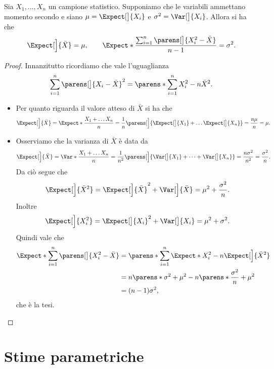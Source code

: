 \begin{proposition}
    Sia $X_1, \dots, X_n$ un campione statistico. Supponiamo che le variabili ammettano momento secondo e siano $\mu = \Expect[\big]{X_i}$ e $\sigma^2 = \Var[\big]{X_i}$. Allora si ha che \[
        \Expect[\Big]{\bar X} = \mu, \qquad \Expect*{\frac{\sum_{i = 1}^n \parens[\big]{X_i^2 - \bar X}}{n - 1}} = \sigma^2.
    \]
\end{proposition}
\begin{proof}
    Innanzitutto ricordiamo che vale l'uguaglianza \[
        \sum_{i = 1}^n \parens[\big]{X_i - \bar X}^2 = \parens*{\sum_{i = 1}^n X_i^2} - n\bar X^2.    
    \]
    \begin{itemize}
        \item Per quanto riguarda il valore atteso di $\bar X$ si ha che \[
            \Expect[\Big]{\bar X} 
            = \Expect*{\frac{X_1 + \dots X_n}{n}} 
            = \frac1n\parens[\Big]{\Expect[\big]{X_1} + \dots \Expect[\big]{X_n}}     
            = \frac{n\mu}{n} = \mu.
        \]
        \item Osserviamo che la varianza di $\bar X$ è data da \[
            \Expect[\Big]{\bar X} 
            = \Var*{\frac{X_1 + \dots X_n}{n}} 
            = \frac1{n^2}\parens[\Big]{\Var[\big]{X_1} + \dots + \Var[\big]{X_n}}     
            = \frac{n\sigma^2}{n^2} = \frac{\sigma^2}{n}.  
        \] Da ciò segue che \[
            \Expect[\Big]{\bar X^2} = \Expect[\Big]{\bar X}^2 + \Var[\Big]{\bar X} = \mu^2 + \frac{\sigma^2}{n}.
        \] Inoltre \[
            \Expect[\Big]{X_i^2} = \Expect[\big]{X_i}^2 + \Var[\big]{X_i} = \mu^2 + \sigma^2.    
        \] Quindi vale che \begin{align*}
            \Expect*{\sum_{i = 1}^n \parens[\big]{X_i^2 - \bar X}}
            &= \parens*{\sum_{i = 1}^n \Expect*{X_i^2}} - n\Expect[\Big]{\bar X^2}\\
            &= n\parens*{\sigma^2 + \mu^2} - n\parens*{\frac{\sigma^2}{n} + \mu^2}\\
            &= (n-1)\sigma^2,
        \end{align*}
        che è la tesi. \qedhere
    \end{itemize}
\end{proof}

\section{Stime parametriche}

